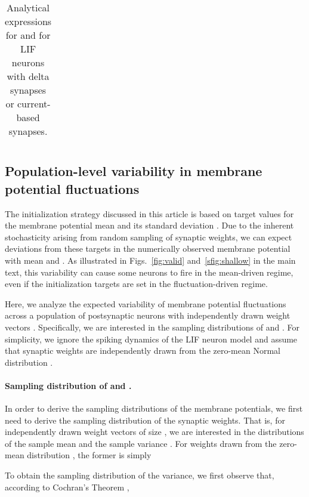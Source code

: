 \documentclass[11pt,a4paper]{article}
\begin{document}
\begin{refsection}
\begin{table}[htpb]
\begin{tabular*}{0.6\textwidth}{@{\extracolsep{\fill}}ccc}
\\
\bottomrule
\end{tabular*}
\caption{Analytical expressions for  and
 for LIF neurons with delta synapses or current-based synapses.}
\label{stab:epsilon}
\end{table}
\renewcommand{\arraystretch}{1.0}



\clearpage

\subsection{Population-level variability in membrane potential fluctuations}
\label{sup:popvar}

The initialization strategy discussed in this article is based on target
values for the membrane potential mean  and its standard deviation
.
Due to the inherent stochasticity arising from random sampling of synaptic
weights, we can expect deviations from these targets in the numerically observed membrane potential with mean  and . 
As illustrated in Figs.~\ref{fig:valid} and~\ref{sfig:shallow} in the main text, this variability can cause some neurons to fire in the mean-driven regime, even if the initialization targets
are set in the fluctuation-driven regime. 

Here, we analyze the expected variability of membrane potential fluctuations across a 
population of  postsynaptic neurons with independently drawn weight vectors
. Specifically, we are interested in the 
sampling distributions of  and . 
For simplicity, we ignore the spiking dynamics of the \ac{LIF} neuron model and assume that synaptic weights are independently drawn from the zero-mean Normal distribution . 

\paragraph{Sampling distribution of  and .} 
In order to derive the sampling distributions of the membrane potentials, we first need to derive the sampling distribution of the synaptic weights. 
That is, for independently drawn weight vectors  of size , we are interested in the distributions of the sample mean  and the sample variance . For weights drawn from the zero-mean distribution , the former is simply

To obtain the sampling distribution of the variance, we first observe that, according to Cochran's Theorem \citep{Cochran1934-rw}, 


\end{refsection}
\end{document}
